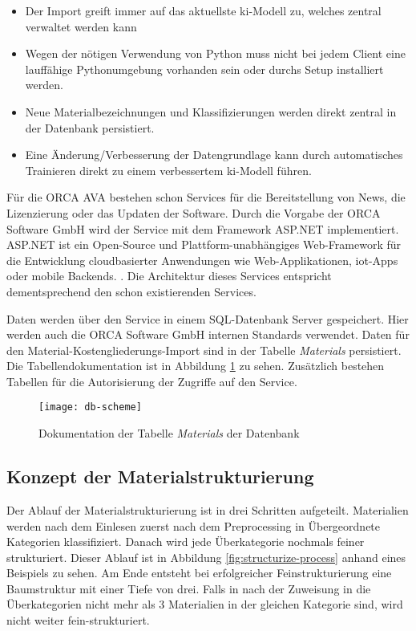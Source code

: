 \begin{itemize}
	\setlength\itemsep{0.3em}
	\item Der Import greift immer auf das aktuellste \ac{ki}-Modell zu, welches zentral verwaltet werden kann
	\item Wegen der nötigen Verwendung von Python muss nicht bei jedem Client eine lauffähige Pythonumgebung vorhanden sein oder durchs Setup installiert werden.
	\item Neue Materialbezeichnungen und Klassifizierungen werden direkt zentral in der Datenbank persistiert.
	\item Eine Änderung/Verbesserung der Datengrundlage kann durch automatisches Trainieren direkt zu einem verbessertem \ac{ki}-Modell führen.
\end{itemize}

Für die ORCA AVA bestehen schon Services für die Bereitstellung von News, die Lizenzierung oder das Updaten der Software. Durch die Vorgabe der ORCA Software GmbH wird der Service mit dem Framework ASP.NET implementiert. ASP.NET ist ein Open-Source und Plattform-unabhängiges Web-Framework für die Entwicklung cloudbasierter Anwendungen wie Web-Applikationen, \ac{iot}-Apps oder mobile Backends. \citep{asp-net}. Die Architektur dieses Services entspricht dementsprechend den schon existierenden Services.

Daten werden über den Service in einem SQL-Datenbank Server gespeichert. Hier werden auch die ORCA Software GmbH internen Standards verwendet. Daten für den Material-Kostengliederungs-Import sind in der Tabelle \textit{Materials} persistiert. Die Tabellendokumentation ist in Abbildung \ref{fig:db-scheme} zu sehen. Zusätzlich bestehen Tabellen für die Autorisierung der Zugriffe auf den Service.

\begin{figure}[h]
	\centering
	\texttt{[image: db-scheme]}
	\caption[Dokumentation]{Dokumentation der Tabelle \textit{Materials} der Datenbank}
	\label{fig:db-scheme}
\end{figure}

\subsection{Konzept der Materialstrukturierung}
\label{c:conception:architecture:structuring}
Der Ablauf der Materialstrukturierung ist in drei Schritten aufgeteilt. Materialien werden nach dem Einlesen zuerst nach dem Preprocessing in Übergeordnete Kategorien klassifiziert. Danach wird jede Überkategorie nochmals feiner strukturiert.
Dieser Ablauf ist in Abbildung \ref{fig:structurize-process} anhand eines Beispiels zu sehen. Am Ende entsteht bei erfolgreicher Feinstrukturierung eine Baumstruktur mit einer Tiefe von drei. Falls in nach der Zuweisung in die Überkategorien nicht mehr als 3 Materialien in der gleichen Kategorie sind, wird nicht weiter fein-strukturiert.

